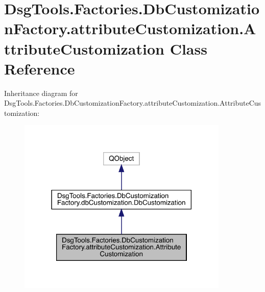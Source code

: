 \hypertarget{class_dsg_tools_1_1_factories_1_1_db_customization_factory_1_1attribute_customization_1_1_attribute_customization}{}\section{Dsg\+Tools.\+Factories.\+Db\+Customization\+Factory.\+attribute\+Customization.\+Attribute\+Customization Class Reference}
\label{class_dsg_tools_1_1_factories_1_1_db_customization_factory_1_1attribute_customization_1_1_attribute_customization}


Inheritance diagram for Dsg\+Tools.\+Factories.\+Db\+Customization\+Factory.\+attribute\+Customization.\+Attribute\+Customization\+:
\nopagebreak
\begin{figure}[H]
\begin{center}
\leavevmode
\includegraphics[width=285pt]{class_dsg_tools_1_1_factories_1_1_db_customization_factory_1_1attribute_customization_1_1_attribb1735117fcd528d2ba830cf405a0692d}
\end{center}
\end{figure}


